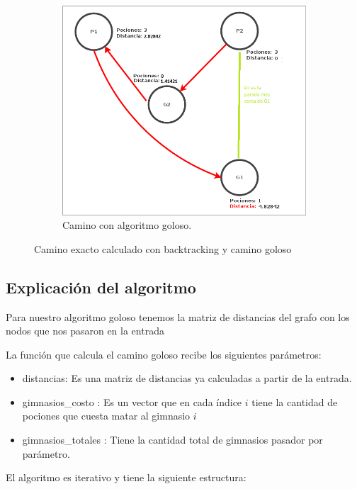 \begin{figure}[H]
\begin{subfigure}[b]{0.49\textwidth}
        \includegraphics[width=\linewidth]{img/ejercicio2/ejercicio1_ejemplo_camino1_4.png}
        \caption{Camino con algoritmo goloso.}
        \label{fig: ejercicio1_ejemplo_camino1_4}
    \end{subfigure}
    \caption{Camino exacto calculado con backtracking y camino goloso}
    \label{fig: ejercicio1_ejemplo_caminos1}
\end{figure}


\subsection{Explicación del algoritmo}

\par Para nuestro algoritmo goloso tenemos la matriz de distancias del grafo con los nodos que nos pasaron en la entrada


\par La función que calcula el camino goloso recibe los siguientes parámetros:
\begin{itemize}
\item distancias: Es una matriz de distancias ya calculadas a partir de la entrada.
\item gimnasios\_costo : Es un vector que en cada índice $i$ tiene la cantidad de pociones que cuesta matar al gimnasio $i$
\item gimnasios\_totales : Tiene la cantidad total de gimnasios pasador por parámetro.
\end{itemize}
\par El algoritmo es iterativo y tiene la siguiente estructura:

